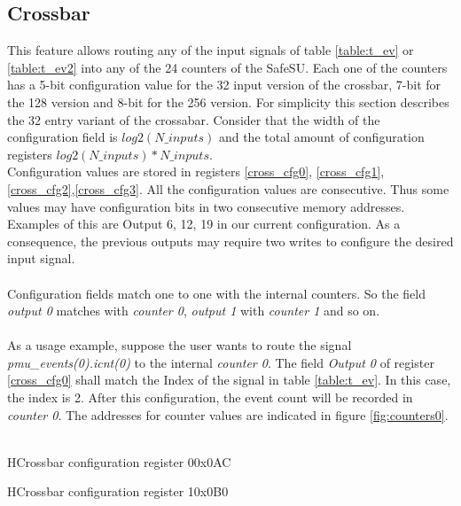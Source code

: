 \subsection{Crossbar}
This feature allows routing any of the input signals of table \ref{table:t_ev} or \ref{table:t_ev2} into any of the 24 counters of the SafeSU. Each one of the counters has a 5-bit configuration value for the 32 input version of the crossbar, 7-bit for the 128 version and 8-bit for the 256 version. For simplicity this section describes the 32 entry variant of the crossabar. Consider that the width of the configuration field is $log2(N\_inputs)$ and the total amount of configuration registers $log2(N\_inputs)*N\_inputs$.\\
Configuration values are stored in registers \ref{cross_cfg0}, \ref{cross_cfg1}, \ref{cross_cfg2},\ref{cross_cfg3}. All the configuration values are consecutive. Thus some values may have configuration bits in two consecutive memory addresses. Examples of this are Output 6, 12, 19 in our current configuration. As a consequence, the previous outputs may require two writes to configure the desired input signal.\\
\\
Configuration fields match one to one with the internal counters. So the field \textit{output 0} matches with \textit{counter 0}, \textit{output 1} with\textit{ counter 1} and so on.\\
\\
As a usage example, suppose the user wants to route the signal \textit{pmu\_events(0).icnt(0)} to the internal \textit{counter 0}. The field \textit{Output 0} of register \ref{cross_cfg0} shall match the  Index of the signal in table \ref{table:t_ev}. In this case, the index is 2. After this configuration, the event count will be recorded in \textit{counter 0}. The addresses for counter values are indicated in figure \ref{fig:counters0}.\\
\\
 \begin{register}{H}{Crossbar configuration register 0}{0x0AC}
	\label{cross_cfg0}
	\regnewline
	
\end{register}

 \begin{register}{H}{Crossbar configuration register 1}{0x0B0}
	\label{cross_cfg1}
	\regnewline
\end{register}

